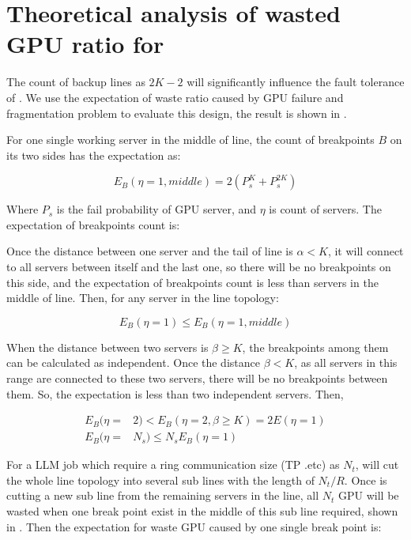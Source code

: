 

\section{Theoretical analysis of wasted GPU ratio for \sys}
\label{appendix:ft-anay}

The count of backup lines as $2K - 2$ will significantly influence the fault tolerance of \sys. We use the expectation of waste ratio caused by GPU failure and fragmentation problem to evaluate this design, the result is shown in .

For one single working server in the middle of line, the count of breakpoints $B$ on its two sides has the expectation as:

\vspace{-1em}
\begin{equation*}
E_B(\eta = 1,middle) = 2(P_s^K + P_s^{2K})
\end{equation*}

Where $P_s$ is the fail probability of GPU server, and $\eta$ is count of servers. The expectation of breakpoints count is:

Once the distance between one server and the tail of line is $\alpha < K$, it will connect to all servers between itself and the last one, so there will be no breakpoints on this side, and the expectation of breakpoints count is less than servers in the middle of line.
Then, for any server in the line topology:

\vspace{-1em}
$$
E_B(\eta = 1) \leq E_B(\eta = 1,middle) 
$$

When the distance between two servers is $\beta \geq K$, the breakpoints among them can be calculated as independent.
Once the distance $\beta < K$, as all servers in this range are connected to these two servers, there will be no breakpoints between them. So, the expectation is less than two independent servers. Then,



\vspace{-1em}
\begin{align*}
E_B(\eta =& 2) < E_B(\eta = 2, \beta \geq K) =  2E(\eta = 1)   \\ 
 E_B(\eta =& N_s) \leq N_s E_B(\eta = 1) 
\end{align*}

For a LLM job which require a ring communication size (TP .etc) as $N_t$, \sys   will cut the whole line topology into several sub lines with the length of $N_t/R$.
Once \sys is cutting a new sub line from the remaining servers in the line, 
all $N_t$ GPU will be wasted when one break point exist in the middle of this sub line required, shown in . 
Then the expectation for waste GPU caused by one single break point is:

